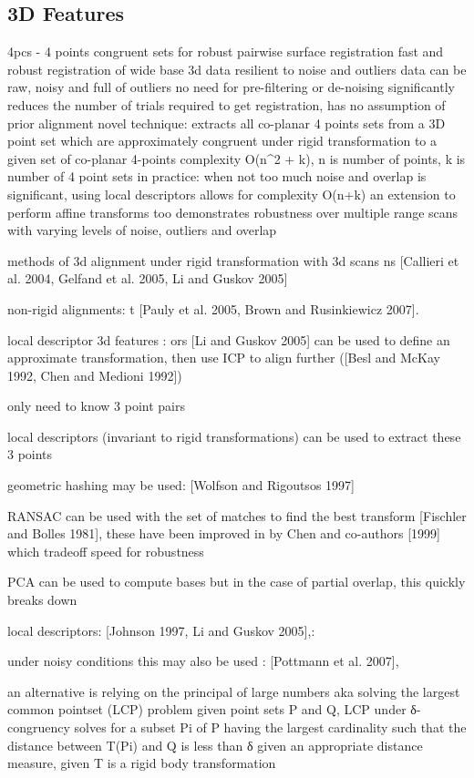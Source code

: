 \subsection{3D Features}

\cite{Aiger084}

4pcs - 4 points congruent sets for robust pairwise surface registration
fast and robust registration of wide base 3d data
resilient to noise and outliers
data can be raw, noisy and full of outliers
no need for pre-filtering or de-noising
significantly reduces the number of trials required to get registration, has no assumption of prior alignment
novel technique:
extracts all co-planar 4 points sets from a 3D point set which are approximately congruent under rigid transformation to a given set of co-planar 4-points
complexity O(n^2 + k), n is number of points, k is number of 4 point sets
in practice: when not too much noise and overlap is significant,
using local descriptors allows for complexity O(n+k)
an extension to perform affine transforms too
demonstrates robustness over multiple range scans with varying levels of noise, outliers and overlap


methods of 3d alignment under rigid transformation with 3d scans
ns [Callieri et al. 2004, Gelfand et al. 2005, Li and Guskov
2005]

non-rigid alignments:
t [Pauly et al. 2005, Brown and
Rusinkiewicz 2007].


local descriptor 3d features : ors [Li and Guskov 2005] can be used to define an approximate transformation, then use ICP to align further ([Besl and McKay 1992, Chen and Medioni 1992])

only need to know 3 point pairs

local descriptors (invariant to rigid transformations) can be used to extract these 3 points

geometric hashing may be used: [Wolfson and Rigoutsos 1997]

RANSAC can be used with the set of matches to find the best transform [Fischler and Bolles 1981], 
these have been improved in by Chen and co-authors [1999] which tradeoff speed for robustness

PCA can be used to compute bases but in the case of partial overlap, this quickly breaks down

local descriptors: [Johnson 1997, Li
and Guskov 2005],: 

under noisy conditions this may also be used : [Pottmann et al. 2007],

an alternative is relying on the principal of large numbers
aka solving the largest common pointset (LCP) problem 
given point sets P and Q, LCP under δ-congruency solves for a subset Pi of P
having the largest cardinality such that the distance between T(Pi) and Q  is less than δ given an appropriate distance measure, given T is a rigid body transformation

